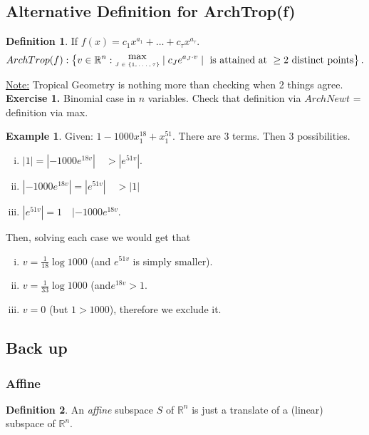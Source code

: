 \documentclass[]{article}
\theoremstyle{definition}
\newtheorem*{defn}{Definition}
\newtheorem{ex}{Example}[section]
\begin{document}
			\subsection{Alternative Definition for ArchTrop(f)}
			\begin{defn}
			If $f(x)=c_1x^{a_1} +\ldots+c_\tau x^{a_\tau}$.
			\begin{align*}
			ArchTrop(f): \left\{ v \in \mathbb{R}^n : \stackanchor{max}{\tiny{$J\in\{1,\ldots,\tau\}$}} \mid c_{J}e^{a_J\cdot v} \mid \text{ is attained at }\geq 2 \text{ distinct points}\right\}.
			\end{align*}
			\end{defn}
			\underline{Note:} Tropical Geometry is nothing more than checking when 2 things agree.
			\\
			\textbf{Exercise 1.} Binomial case in $n$ variables. Check that definition via $ArchNewt$ = definition via max.
			\begin{ex}
			Given: $1-1000x_1^{18}+x_1^{51}.$ There are 3 terms. Then 3 possibilities.
			\begin{enumerate}[(i)]
			\item $|1|=|-1000e^{18v}| \quad > |e^{51v}|$.
			\item $|-1000e^{18v}| = | e^{51v}| \quad > |1|$
			\item $|e^{51v}| = 1 \quad |-1000e^{18v}$.
			\end{enumerate}
			Then, solving each case we would get that 
			\begin{enumerate}[(i)]
			\item $v= \frac{1}{18} \log 1000$ (and $e^{51v}$ is simply smaller).
			\item $v = \frac{1}{33} \log 1000$ (and$ e^{18v}>1$.
			\item $v=0$ (but $1>1000$), therefore we exclude it.
			\end{enumerate}
			\end{ex}
			\subsection{Back up}
			\subsubsection{Affine}
			\begin{defn}
			An \emph{affine} subspace $S$ of $\mathbb{R}^n$ is just a translate of a (linear) subspace of $\mathbb{R}^n$.
			\end{defn}
\end{document}
